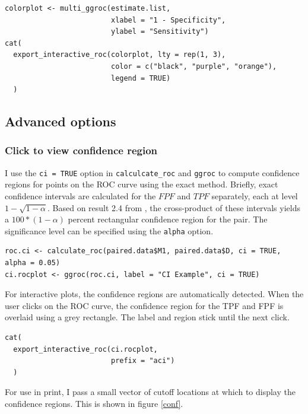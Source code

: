 \documentclass[article]{jss}
\begin{document}
\begin{verbatim}
colorplot <- multi_ggroc(estimate.list, 
                         xlabel = "1 - Specificity", 
                         ylabel = "Sensitivity")
cat(
  export_interactive_roc(colorplot, lty = rep(1, 3), 
                         color = c("black", "purple", "orange"), 
                         legend = TRUE)
  )
\end{verbatim}

\subsection{Advanced options}\label{advanced-options}

\subsubsection{Click to view confidence
region}\label{click-to-view-confidence-region}

I use the \texttt{ci = TRUE} option in \texttt{calculcate\_roc} and
\texttt{ggroc} to compute confidence regions for points on the ROC curve
using the \citet{clopper1934use} exact method. Briefly, exact confidence
intervals are calculated for the \(FPF\) and \(TPF\) separately, each at
level \(1 - \sqrt{1 - \alpha}\). Based on result 2.4 from
\citet{pepe2003statistical}, the cross-product of these intervals yields
a \(100 * (1 - \alpha)\) percent rectangular confidence region for the
pair. The significance level can be specified using the \texttt{alpha}
option.

\begin{verbatim}
roc.ci <- calculate_roc(paired.data$M1, paired.data$D, ci = TRUE, alpha = 0.05)
ci.rocplot <- ggroc(roc.ci, label = "CI Example", ci = TRUE)
\end{verbatim}

For interactive plots, the confidence regions are automatically
detected. When the user clicks on the ROC curve, the confidence region
for the TPF and FPF is overlaid using a grey rectangle. The label and
region stick until the next click.

\begin{verbatim}
cat(
  export_interactive_roc(ci.rocplot, 
                         prefix = "aci")
  )
\end{verbatim}

For use in print, I pass a small vector of cutoff locations at which to
display the confidence regions. This is shown in figure \ref{conf}.
\end{document}
